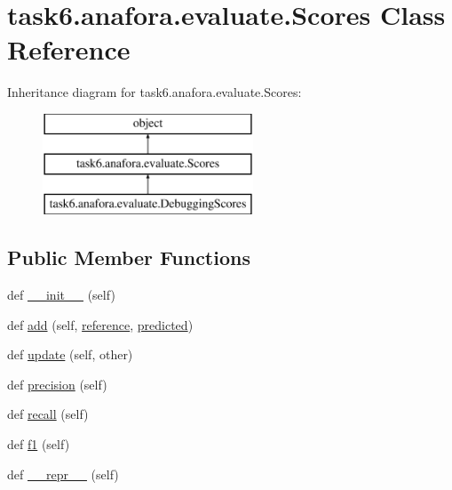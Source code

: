 \hypertarget{classtask6_1_1anafora_1_1evaluate_1_1Scores}{}\section{task6.\+anafora.\+evaluate.\+Scores Class Reference}
\label{classtask6_1_1anafora_1_1evaluate_1_1Scores}
Inheritance diagram for task6.\+anafora.\+evaluate.\+Scores\+:\begin{figure}[H]
\begin{center}
\leavevmode
\includegraphics[height=3.000000cm]{classtask6_1_1anafora_1_1evaluate_1_1Scores}
\end{center}
\end{figure}
\subsection*{Public Member Functions}
\begin{DoxyCompactItemize}
\item 
def \hyperlink{classtask6_1_1anafora_1_1evaluate_1_1Scores_aed52bae7b392d0c1c81faaec45287997}{\+\_\+\+\_\+init\+\_\+\+\_\+} (self)
\item 
def \hyperlink{classtask6_1_1anafora_1_1evaluate_1_1Scores_ac99fe62b32b6558f53ee4ae78d48173c}{add} (self, \hyperlink{classtask6_1_1anafora_1_1evaluate_1_1Scores_a9c17cca5f0fea67554a3509fef3b7cb5}{reference}, \hyperlink{classtask6_1_1anafora_1_1evaluate_1_1Scores_ae1bf8971c36ccbe9f991c6b21a52bf9d}{predicted})
\item 
def \hyperlink{classtask6_1_1anafora_1_1evaluate_1_1Scores_a921f15b8f33a77675be233ec9c05d4fc}{update} (self, other)
\item 
def \hyperlink{classtask6_1_1anafora_1_1evaluate_1_1Scores_a24bd587635f958405938b3dee839f333}{precision} (self)
\item 
def \hyperlink{classtask6_1_1anafora_1_1evaluate_1_1Scores_a57bb79babc021a989973e116b2b71d50}{recall} (self)
\item 
def \hyperlink{classtask6_1_1anafora_1_1evaluate_1_1Scores_abec93b5c96360088bd44b83d71a48a0f}{f1} (self)
\item 
def \hyperlink{classtask6_1_1anafora_1_1evaluate_1_1Scores_adbd10448e0f7c750c4ffc33b70929989}{\+\_\+\+\_\+repr\+\_\+\+\_\+} (self)
\end{DoxyCompactItemize}
